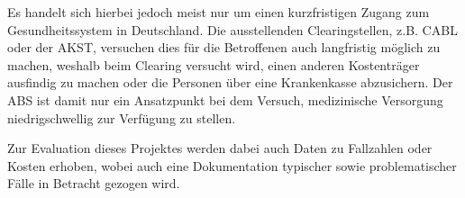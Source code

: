 Es handelt sich hierbei jedoch meist nur um einen kurzfristigen Zugang zum Gesundheitssystem in Deutschland. Die ausstellenden Clearingstellen, z.B. \ac{CABL} oder der \ac{AKST}, versuchen dies für die Betroffenen auch langfristig möglich zu machen, weshalb beim Clearing versucht wird, einen anderen Kostenträger ausfindig zu machen oder die Personen über eine Krankenkasse abzusichern. Der \acs{ABS} ist damit nur ein Ansatzpunkt bei dem Versuch, medizinische Versorgung niedrigschwellig zur Verfügung zu stellen.

Zur Evaluation dieses Projektes werden dabei auch Daten zu Fallzahlen oder Kosten erhoben, wobei auch eine Dokumentation typischer sowie problematischer Fälle in Betracht gezogen wird. \citep{Zanders.2022}